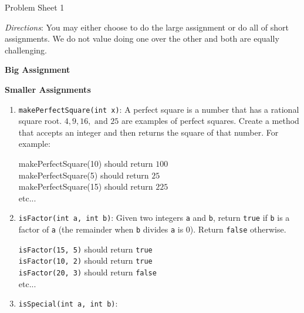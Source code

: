 \documentclass[11pt,fleqn]{article}
\theoremstyle{definition}
\begin{document}
\begin{center}
{\Huge
Problem Sheet 1 %
}\\
\end{center}

\textit{Directions}: You may either choose to do the large assignment or do all of short assignments. We do not value doing one over the other and both are equally challenging.

\begin{center}
\textbf{Big Assignment}
\end{center}


\begin{center}
\textbf{Smaller Assignments}
\end{center}

\begin{enumerate}[Q1.]

\item
\texttt{makePerfectSquare(int x)}: A perfect square is a number that has a rational square root. $4, 9, 16, \text{ and } 25$ are examples of perfect squares. Create a method that accepts an integer and then returns the square of that number. For example:

makePerfectSquare(10) should return $100$\\
makePerfectSquare(5) should return $25$\\
makePerfectSquare(15) should return $225$\\
etc...

\item
\texttt{isFactor(int a, int b)}: Given two integers \texttt{a} and \texttt{b}, return \texttt{true} if \texttt{b} is a factor of \texttt{a} (the remainder when \texttt{b} divides \texttt{a} is 0). Return \texttt{false} otherwise.

\texttt{isFactor(15, 5)} should return \texttt{true}\\
\texttt{isFactor(10, 2)} should return \texttt{true}\\
\texttt{isFactor(20, 3)} should return \texttt{false}\\
etc...

\item
\texttt{isSpecial(int a, int b)}:



\end{enumerate}
\end{document}
